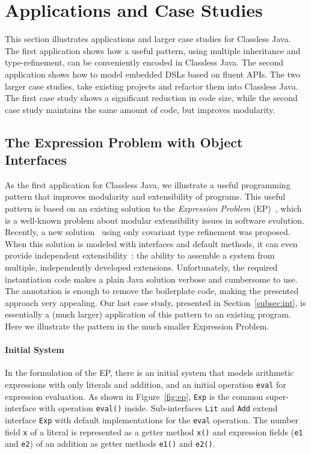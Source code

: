 \section{Applications and Case Studies}

This section illustrates applications and larger case studies for
Classless Java. The first application shows how a useful pattern,
using multiple inheritance and type-refinement, can be conveniently
encoded in Classless Java. The second application shows how to model
embedded DSLs based on fluent APIs. The two larger case studies, take
existing projects and refactor them into Classless Java. The first
case study shows a significant reduction in code size, while the
second case study maintains the same amount of code, but improves
modularity.

\subsection{The Expression Problem with Object Interfaces}\label{subsec:ep}

As the first application for Classless Java, we illustrate a useful
programming pattern that improves modularity and extensibility of
programs. This useful pattern is based on an existing solution to
the \emph{Expression Problem} (EP)~\cite{wadler98expression}, which is a well-known
problem about modular extensibility issues in software evolution. Recently, a
new solution~\cite{eptrivially} using only covariant type refinement was
proposed. When this solution is modeled with interfaces and default methods, it
can even provide independent extensibility~\cite{zenger05independentlyextensible}: the ability to assemble a system
from multiple, independently developed extensions. Unfortunately, the
required instantiation code makes a plain Java solution verbose and cumbersome
to use. The \mixin annotation is enough to remove the boilerplate code, making
the presented approach very appealing. Our last case study, presented
in Section~\ref{subsec:int}, is essentially a (much larger) application of this
pattern to an existing program. Here we illustrate the pattern in the
much smaller Expression Problem.

\paragraph{Initial System}
In the formulation of the EP, there is an initial system that models
arithmetic expressions with only literals and addition, and an initial
operation \texttt{eval} for expression evaluation.
As shown in Figure~\ref{fig:ep}, \texttt{Exp} is the common
super-interface with operation \texttt{eval()}
inside. Sub-interfaces \texttt{Lit} and \texttt{Add} extend interface
\texttt{Exp} with default implementations for the \texttt{eval} operation. The
number field \texttt{x} of a literal is represented as a getter method
\texttt{x()} and expression fields (\texttt{e1} and \texttt{e2}) of an addition
as getter methods \texttt{e1()} and \texttt{e2()}.

